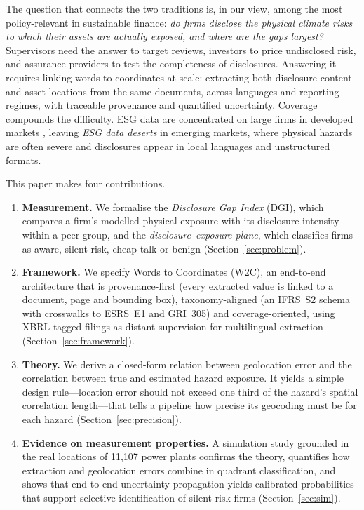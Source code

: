 \documentclass{article}
\theoremstyle{plain}
\theoremstyle{definition}
\begin{document}
The question that connects the two traditions is, in our view, among the most policy-relevant in sustainable finance: \emph{do firms disclose the physical climate risks to which their assets are actually exposed, and where are the gaps largest?} Supervisors need the answer to target reviews, investors to price undisclosed risk, and assurance providers to test the completeness of disclosures. Answering it requires linking words to coordinates at scale: extracting both disclosure content and asset locations from the same documents, across languages and reporting regimes, with traceable provenance and quantified uncertainty. Coverage compounds the difficulty. ESG data are concentrated on large firms in developed markets \citep{kotsantonis2019four}, leaving \emph{ESG data deserts} in emerging markets, where physical hazards are often severe and disclosures appear in local languages and unstructured formats.

This paper makes four contributions.
\begin{enumerate}[leftmargin=1.6em]
  \item \textbf{Measurement.} We formalise the \emph{Disclosure Gap Index} (DGI), which compares a firm's modelled physical exposure with its disclosure intensity within a peer group, and the \emph{disclosure--exposure plane}, which classifies firms as aware, silent risk, cheap talk or benign (Section~\ref{sec:problem}).
  \item \textbf{Framework.} We specify Words to Coordinates (W2C), an end-to-end architecture that is provenance-first (every extracted value is linked to a document, page and bounding box), taxonomy-aligned (an IFRS~S2 schema with crosswalks to ESRS~E1 and GRI~305) and coverage-oriented, using XBRL-tagged filings as distant supervision for multilingual extraction (Section~\ref{sec:framework}).
  \item \textbf{Theory.} We derive a closed-form relation between geolocation error and the correlation between true and estimated hazard exposure. It yields a simple design rule---location error should not exceed one third of the hazard's spatial correlation length---that tells a pipeline how precise its geocoding must be for each hazard (Section~\ref{sec:precision}).
  \item \textbf{Evidence on measurement properties.} A simulation study grounded in the real locations of 11,107 power plants confirms the theory, quantifies how extraction and geolocation errors combine in quadrant classification, and shows that end-to-end uncertainty propagation yields calibrated probabilities that support selective identification of silent-risk firms (Section~\ref{sec:sim}).
\end{enumerate}
\end{document}
